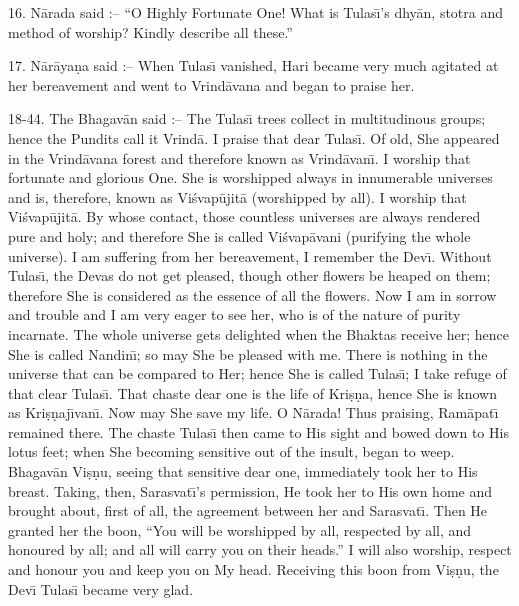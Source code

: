 16. N\=arada said :-- ``O Highly Fortunate One! What is Tulas\={\i}'s dhy\=an, stotra and method of worship? Kindly describe all these.''

17. N\=ar\=aya\d{n}a said :-- When Tulas\={\i} vanished, Hari became very much agitated at her bereavement and went to Vrind\=avana and began to praise her.

18-44. The Bhagav\=an said :-- The Tulas\={\i} trees collect in multitudinous groups; hence the Pundits call it Vrind\=a. I praise that dear Tulas\={\i}. Of old, She appeared in the Vrind\=avana forest and therefore known as Vrind\=avan\={\i}. I worship that fortunate and glorious One. She is worshipped always in innumerable universes and is, therefore, known as Vi\'svap\=ujit\=a (worshipped by all). I worship that Vi\'svap\=ujit\=a. By whose contact, those countless universes are always rendered pure and holy; and therefore She is called Vi\'svap\=avani (purifying the whole universe). I am suffering from her bereavement, I remember the Dev\={\i}. Without Tulas\={\i}, the Devas do not get pleased, though other flowers be heaped on them; therefore She is considered as the essence of all the flowers. Now I am in sorrow and trouble and I am very eager to see her, who is of the nature of purity incarnate. The whole universe gets delighted when the Bhaktas receive her; hence She is called Nandin\={\i}; so may She be pleased with me. There is nothing in the universe that can be compared to Her; hence She is called Tulas\={\i}; I take refuge of that clear Tulas\={\i}. That chaste dear one is the life of Kri\d{s}\d{n}a, hence She is known as Kri\d{s}\d{n}aj\={\i}van\={\i}. Now may She save my life. O N\=arada! Thus praising, Ram\=apat\={\i} remained there. The chaste Tulas\={\i} then came to His sight and bowed down to His lotus feet; when She becoming sensitive out of the insult, began to weep. Bhagav\=an Vi\d{s}\d{n}u, seeing that sensitive dear one, immediately took her to His breast. Taking, then, Sarasvat\={\i}'s permission, He took her to His own home and brought about, first of all, the agreement between her and Sarasvat\={\i}. Then He granted her the boon, ``You will be worshipped by all, respected by all, and honoured by all; and all will carry you on their heads.'' I will also worship, respect and honour you and keep you on My head. Receiving this boon from Vi\d{s}\d{n}u, the Dev\={\i} Tulas\={\i} became very glad.

